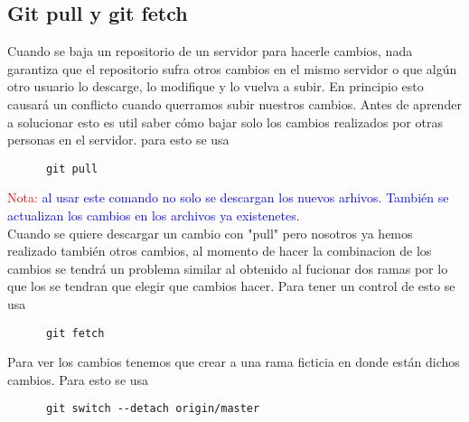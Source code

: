 \documentclass[10pt,oneside]{article}
\begin{document}
\begin{multicols}{2}
  \subsection{Git pull y git fetch} Cuando se baja un repositorio de un servidor para hacerle cambios, nada garantiza que el repositorio sufra otros cambios en el mismo servidor o que algún otro usuario lo descarge, lo modifique y lo vuelva a subir. En principio esto causará un conflicto cuando querramos subir nuestros cambios. Antes de aprender a solucionar esto es util saber cómo bajar solo los cambios realizados por otras personas en el servidor. para esto se usa \begin{verbatim}
      git pull
  \end{verbatim}
  \textcolor{red}{Nota:} \textcolor{blue}{al usar este comando no solo se descargan los nuevos arhivos. También se actualizan los cambios en los archivos ya existenetes.} \\ \newline
  Cuando se quiere descargar un cambio con "pull" pero nosotros ya hemos realizado también otros cambios, al momento de hacer la combinacion de los cambios se tendrá un problema similar al obtenido al fucionar dos ramas por lo que los se tendran que elegir que cambios hacer. Para tener un control de esto se usa \begin{verbatim}
      git fetch
  \end{verbatim} 
  Para ver los cambios tenemos que crear a una rama ficticia en donde están dichos cambios. Para esto se usa \begin{verbatim}
      git switch --detach origin/master
  \end{verbatim}
  \end{multicols}
\end{document}
